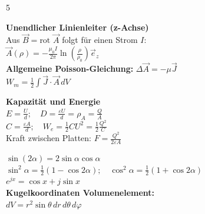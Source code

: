 \documentclass[a4paper, 2pt, landscape]{extarticle}
\begin{document}
\begin{multicols*}{5}
\begin{tcolorbox}[title={Magnetostatik: Vektorpotential $\vec{A}$ (Blatt 6)}, colback=white, colframe=black]
\textbf{Unendlicher Linienleiter (z-Achse)} \\
Aus $\vec{B} = \text{rot } \vec{A}$ folgt für einen Strom $I$: \\
$\vec{A}(\rho) = -\frac{\mu_0 I}{2\pi} \ln\left(\frac{\rho}{\rho_0}\right) \vec{e}_z$ \\
\textbf{Allgemeine Poisson-Gleichung:} $\Delta \vec{A} = -\mu \vec{J}$ \\
$W_m = \frac{1}{2} \int \vec{J} \cdot \vec{A} \, dV$
\end{tcolorbox}

\begin{tcolorbox}[title={Energie: Plattenkondensator (Blatt 4)}, colback=white, colframe=black]
\textbf{Kapazität und Energie} \\
$E = \frac{U}{d} ; \quad D = \frac{\varepsilon U}{d} = \rho_A = \frac{Q}{A}$ \\
$C = \frac{\varepsilon A}{d} ; \quad W_e = \frac{1}{2} C U^2 = \frac{1}{2} \frac{Q^2}{C}$ \\
Kraft zwischen Platten: $F = \frac{Q^2}{2\varepsilon A}$
\end{tcolorbox}

\begin{tcolorbox}[title={Mathematik: Trigonometrie \& Koordinaten}, colback=white, colframe=black]
$\sin(2\alpha) = 2 \sin\alpha \cos\alpha$ \\
$\sin^2\alpha = \frac{1}{2}(1-\cos 2\alpha) ; \quad \cos^2\alpha = \frac{1}{2}(1+\cos 2\alpha)$ \\
$e^{jx} = \cos x + j \sin x$ \\
\textbf{Kugelkoordinaten Volumenelement:} \\
$dV = r^2 \sin\theta \, dr \, d\theta \, d\varphi$
\end{tcolorbox}

\end{multicols*}
\end{document}
